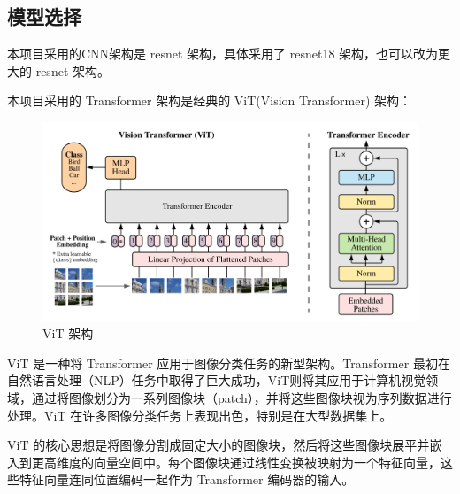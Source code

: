 \documentclass[notitlepage,cs4size,punct,oneside]{ctexrep}
\numberwithin{equation}{chapter}
\theoremstyle{mystyle}
\begin{document}
\subsection{模型选择}
本项目采用的CNN架构是 resnet 架构，具体采用了 resnet18 架构，也可以改为更大的 resnet 架构。

本项目采用的 Transformer 架构是经典的 ViT(Vision Transformer) 架构：
\begin{figure}[H]
    \centering
    \includegraphics[scale=0.55]{ViT.png}
    \caption{ViT 架构}
\end{figure}
ViT 是一种将 Transformer 应用于图像分类任务的新型架构。Transformer 最初在自然语言处理（NLP）任务中取得了巨大成功，ViT则将其应用于计算机视觉领域，通过将图像划分为一系列图像块（patch），并将这些图像块视为序列数据进行处理。ViT 在许多图像分类任务上表现出色，特别是在大型数据集上。

ViT 的核心思想是将图像分割成固定大小的图像块，然后将这些图像块展平并嵌入到更高维度的向量空间中。每个图像块通过线性变换被映射为一个特征向量，这些特征向量连同位置编码一起作为 Transformer 编码器的输入。
\end{document}
